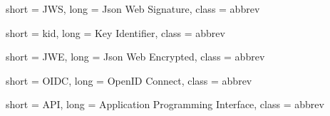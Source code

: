 

 {
    short = JWS,
    long = Json Web Signature,
    class = abbrev
}


 {
    short = kid,
    long = Key Identifier,
    class = abbrev
}

 {
    short = JWE,
    long = Json Web Encrypted,
    class = abbrev
}

 {
    short = OIDC,
    long = OpenID Connect,
    class = abbrev
}

 {
    short = API,
    long = Application Programming Interface,
    class = abbrev
}
